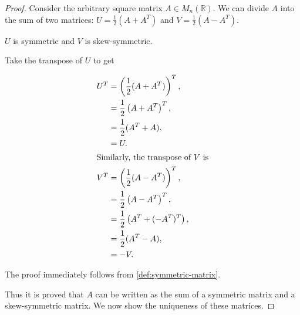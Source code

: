 \begin{enumerate}
\begin{enumerate}
                \smallskip

                \begin{proof}
                    Consider the arbitrary square matrix $A \in M_n(\mathbb{R})$.
                    We can divide $A$ into the sum of two matrices: $U = \frac{1}{2} (A + A^T)$ and $V = \frac{1}{2} (A - A^T)$.

                    \smallskip

                    \begin{claim} \label{claim:3b-1}
                        $U$ is symmetric and $V$ is skew-symmetric.
                    \end{claim}

                    \begin{subproof}
                        Take the transpose of $U$ to get
                        \begin{spreadlines}{\baselineskip}
                            \begin{align*}
                                U^T &= \left(\frac{1}{2} (A + A^T)\right)^T, \\
                                &= \frac{1}{2} \left(A + A^T\right)^T, \\
                                &= \frac{1}{2} (A^T + A), \\
                                &= U. \\
                                \intertext{Similarly, the transpose of $V$ is}
                                V^T &= \left(\frac{1}{2} (A - A^T)\right)^T, \\
                                &= \frac{1}{2} \left(A - A^T\right)^T, \\
                                &= \frac{1}{2} \left(A^T + (- A^T)^T\right), \\
                                &= \frac{1}{2} (A^T - A), \\
                                &= - V.
                            \end{align*}
                        \end{spreadlines}

                        The proof immediately follows from \cref{def:symmetric-matrix}.
                    \end{subproof}

                    \smallskip

                    Thus it is proved that $A$ can be written as the sum of a symmetric matrix and a skew-symmetric matrix.
                    We now show the uniqueness of these matrices.


\end{proof}
\end{enumerate}
\end{enumerate}
